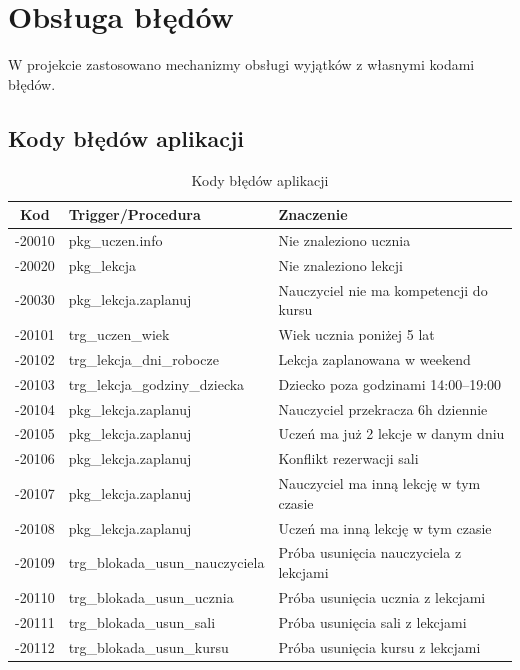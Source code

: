 \documentclass[12pt,a4paper]{article}
\begin{document}
\newpage
\section{Obsługa błędów}

W projekcie zastosowano mechanizmy obsługi wyjątków z własnymi kodami błędów.

\subsection{Kody błędów aplikacji}

\begin{table}[h]
\centering
\small
\begin{tabular}{|c|l|p{6cm}|}
\hline
\textbf{Kod} & \textbf{Trigger/Procedura} & \textbf{Znaczenie} \\
\hline
-20010 & pkg\_uczen.info & Nie znaleziono ucznia \\
\hline
-20020 & pkg\_lekcja & Nie znaleziono lekcji \\
\hline
-20030 & pkg\_lekcja.zaplanuj & Nauczyciel nie ma kompetencji do kursu \\
\hline
-20101 & trg\_uczen\_wiek & Wiek ucznia poniżej 5 lat \\
\hline
-20102 & trg\_lekcja\_dni\_robocze & Lekcja zaplanowana w weekend \\
\hline
-20103 & trg\_lekcja\_godziny\_dziecka & Dziecko poza godzinami 14:00--19:00 \\
\hline
-20104 & pkg\_lekcja.zaplanuj & Nauczyciel przekracza 6h dziennie \\
\hline
-20105 & pkg\_lekcja.zaplanuj & Uczeń ma już 2 lekcje w danym dniu \\
\hline
-20106 & pkg\_lekcja.zaplanuj & Konflikt rezerwacji sali \\
\hline
-20107 & pkg\_lekcja.zaplanuj & Nauczyciel ma inną lekcję w tym czasie \\
\hline
-20108 & pkg\_lekcja.zaplanuj & Uczeń ma inną lekcję w tym czasie \\
\hline
-20109 & trg\_blokada\_usun\_nauczyciela & Próba usunięcia nauczyciela z lekcjami \\
\hline
-20110 & trg\_blokada\_usun\_ucznia & Próba usunięcia ucznia z lekcjami \\
\hline
-20111 & trg\_blokada\_usun\_sali & Próba usunięcia sali z lekcjami \\
\hline
-20112 & trg\_blokada\_usun\_kursu & Próba usunięcia kursu z lekcjami \\
\hline
\end{tabular}
\caption{Kody błędów aplikacji}
\end{table}
\end{document}
